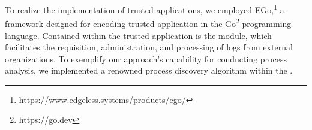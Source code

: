To realize the implementation of trusted applications, we employed EGo,\footnote{https://www.edgeless.systems/products/ego/} a framework designed for encoding trusted application in the Go\footnote{https://go.dev} programming language. Contained within the trusted application is the  module, which facilitates the requisition, administration, and processing of logs from external organizations. To exemplify our approach's capability for conducting process analysis, we implemented a renowned process discovery algorithm within the . 










\begin{comment}
In this section, we describe the implementation of our paper. The implementation proposed integrates a trusted application running in a trusted execution environment and some event logs generated to address the solution proposed in the motivating scenario. The code is available at the following address: \url{https://github.com/dave0909/TEExProcessMining/}

We have encoded a well-known process discovery algorithm within the \texttt{Secure Miner} component to demonstrate the capability of conducting process analytics tasks with our approach.
To implement the trusted applications, we used the EGo,%
\footnote{https://www.edgeless.systems/products/ego/} 
a framework to encode programs for TEEs in %
GO.%
\footnote{https://go.dev}
Within the TA there is the ``Secure Miner" module, which allows logs from other organizations to be requested, managed, and processed. Log processing is made possible by the implementation of the ``Heuristc Miner" process mining algorithm\ref{weijters2006process}, which takes the log traces as input and performs a discovery operation.
The output of the algorithm is a PNML\footnote{https://www.pnml.org}(Petri Net Markup Language) which allows the representation of Petri nets that graphically illustrate the model calculated by the algorithm. 
In order to generate the graphic image of the Petri net, we used the WoPed\footnote{https://woped.dhbw-karlsruhe.de} software, which takes as input a PNML file and provides the graphic representation of the Petri net. 

Another fundamental module within the TA is the Log Provider. We wrote this part of TA in Go. The log provider is listening for log requests from other organizations on one of the ports set by the owning organization. When an organization decides to start the mining process, it requests the logs of the other organizations. The log providers accepts requests made by the organization that starting the mining operation and forwards its log.
\end{comment}

